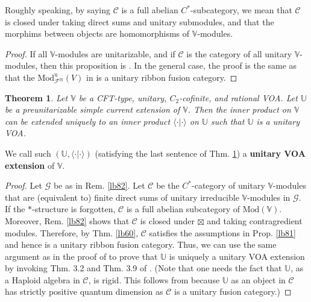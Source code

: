 \documentclass[11pt,b5paper,notitlepage]{article}
\theoremstyle{definition}
\theoremstyle{plain}
\newtheorem{thm}[df]{Theorem}
\newcommand{\mc}{\mathcal}
\newcommand{\bk}[1]{\langle {#1}\rangle}
\newcommand{\Vbb}{\mathbb V}
\newcommand{\Ubb}{\mathbb U}
\newcommand{\Mod}{\mathrm{Mod}}
\numberwithin{equation}{section}
\begin{document}
Roughly speaking, by saying $\mc C$ is a full abelian $C^*$-subcategory, we mean that $\mc C$ is closed under taking direct sums and unitary submodules, and that the morphims between objects are homomorphisms of $\Vbb$-modules.


\begin{proof}
If all $\Vbb$-modules are unitarizable, and if $\mc C$ is the category of all unitary $\Vbb$-modules, then this proposition is \cite[Thm. 7.9]{Gui19b}. In the general case, the proof is the same as that the $\Mod^{\mathrm u}_{\mc F^\boxtimes}(V)$ in \cite[Thm. 7.8]{Gui19b} is a unitary ribbon fusion category.
\end{proof}


\begin{thm}\label{lb80}
Let $\Vbb$ be a CFT-type, unitary, $C_2$-cofinite, and rational VOA. Let $\Ubb$ be a preunitarizable simple current extension of $\Vbb$. Then the inner product on $\Vbb$ can be extended uniquely to an inner product $\bk{\cdot|\cdot}$ on $\Ubb$ such that $\Ubb$ is a unitary VOA.
\end{thm}

We call such $(\Ubb,\bk{\cdot|\cdot})$ (satisfying the last sentence of Thm. \ref{lb80}) a \textbf{unitary VOA extension} of $\Vbb$.





\begin{proof}
Let $\mc G$ be as in Rem. \ref{lb82}. Let $\mc C$ be the $C^*$-category of unitary $\Vbb$-modules that are (equivalent to) finite direct sums of unitary irreducible $\Vbb$-modules in $\mc G$. If the $*$-structure is forgotten, $\mc C$ is a full abelian subcategory of $\Mod(\Vbb)$. Moreover, Rem. \ref{lb82} shows that $\mc C$ is closed under $\boxtimes$ and taking contragredient modules. Therefore, by Thm. \ref{lb60}, $\mc C$ satisfies the assumptions in Prop. \ref{lb81} and hence is a unitary ribbon fusion category. Thus, we can use the same argument as in the proof of \cite[Thm. 4.7]{CGGH23} to prove that $\Ubb$ is uniquely a unitary VOA extension by invoking Thm. 3.2 and Thm. 3.9 of \cite{CGGH23}. (Note that one needs the fact that $\Ubb$, as a Haploid algebra in $\mc C$, is rigid. This follows from \cite[Lem. 1.20]{KO02} because $\Ubb$ as an object in $\mc C$ has strictly positive quantum dimension as $\mc C$ is a unitary fusion category.)
\end{proof}
\end{document}
